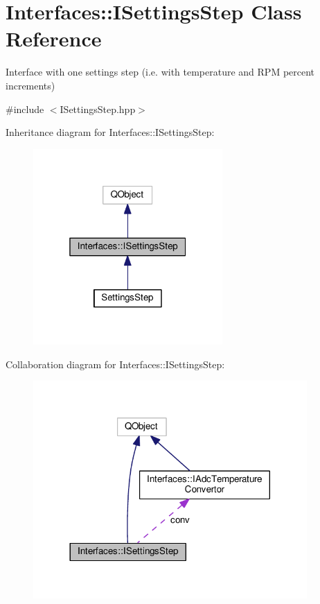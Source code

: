 \hypertarget{class_interfaces_1_1_i_settings_step}{}\section{Interfaces\+:\+:I\+Settings\+Step Class Reference}
\label{class_interfaces_1_1_i_settings_step}


Interface with one settings step (i.\+e. with temperature and R\+PM percent increments)  




{\ttfamily \#include $<$I\+Settings\+Step.\+hpp$>$}



Inheritance diagram for Interfaces\+:\+:I\+Settings\+Step\+:\nopagebreak
\begin{figure}[H]
\begin{center}
\leavevmode
\includegraphics[width=205pt]{class_interfaces_1_1_i_settings_step__inherit__graph}
\end{center}
\end{figure}


Collaboration diagram for Interfaces\+:\+:I\+Settings\+Step\+:\nopagebreak
\begin{figure}[H]
\begin{center}
\leavevmode
\includegraphics[width=296pt]{class_interfaces_1_1_i_settings_step__coll__graph}
\end{center}
\end{figure}
